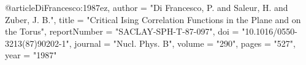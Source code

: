@article{DiFrancesco:1987ez,
    author = "Di Francesco, P. and Saleur, H. and Zuber, J. B.",
    title = "{Critical Ising Correlation Functions in the Plane and on the Torus}",
    reportNumber = "SACLAY-SPH-T-87-097",
    doi = "10.1016/0550-3213(87)90202-1",
    journal = "Nucl. Phys. B",
    volume = "290",
    pages = "527",
    year = "1987"
}